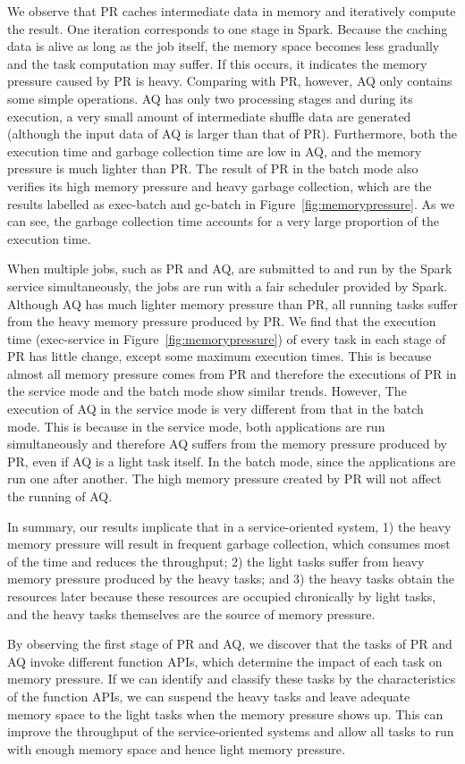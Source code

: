 We observe that PR caches intermediate data in memory and iteratively compute the result. One iteration corresponds to one stage in Spark. Because the caching data is alive as long as the job itself, the memory space becomes less gradually
and the task computation may suffer. If this occurs, it indicates the memory pressure caused by PR is heavy. Comparing with PR, however, AQ only contains some simple operations. AQ has only two processing stages and during its execution, a very small amount of intermediate shuffle data are generated (although the input data of AQ is larger than that of PR). Furthermore, both the execution time and garbage collection time are low in AQ, and the memory pressure is much lighter than PR. The result of PR in the batch mode also verifies its high memory pressure and heavy garbage collection, which are the results labelled as exec-batch and gc-batch in Figure~\ref{fig:memorypressure}. As we can see, the garbage collection time accounts for a very large proportion of the execution time.

When multiple jobs, such as PR and AQ, are submitted to and run by the Spark service simultaneously, the jobs are run with a fair scheduler provided by Spark. Although AQ has much lighter memory pressure than PR, all running tasks suffer from the heavy memory pressure produced by PR. We find that the execution time (exec-service in Figure~\ref{fig:memorypressure}) of every task in each stage of PR has little change, except some maximum execution times. This is because almost all memory pressure comes from PR and therefore the executions of PR in the service mode and the batch mode show similar trends. However, The execution of AQ in the service mode is very different from that in the batch mode. This is because in the service mode, both applications are run simultaneously and therefore AQ suffers from the memory pressure produced by PR, even if AQ is a light task itself. In the batch mode, since the applications are run one after another. The high memory pressure created by PR will not affect the running of AQ.

In summary, our results implicate that in a service-oriented system, 1) the heavy memory pressure will result in frequent garbage collection, which consumes most of the time and reduces the throughput; 2) the light tasks suffer from heavy memory pressure produced by the heavy tasks; and 3) the heavy tasks obtain the resources later because these resources are occupied chronically by light tasks, and the heavy tasks themselves are the source of memory pressure.

By observing the first stage of PR and AQ, we discover that the tasks of PR and AQ invoke different function APIs, which determine the impact of each task on memory pressure. If we can identify and classify these tasks by the characteristics of the function APIs, we can suspend the heavy tasks and leave adequate memory space to the light tasks when the memory pressure shows up. This can improve the throughput of the service-oriented systems and allow all tasks to run with enough memory space and hence light memory pressure. 
  
